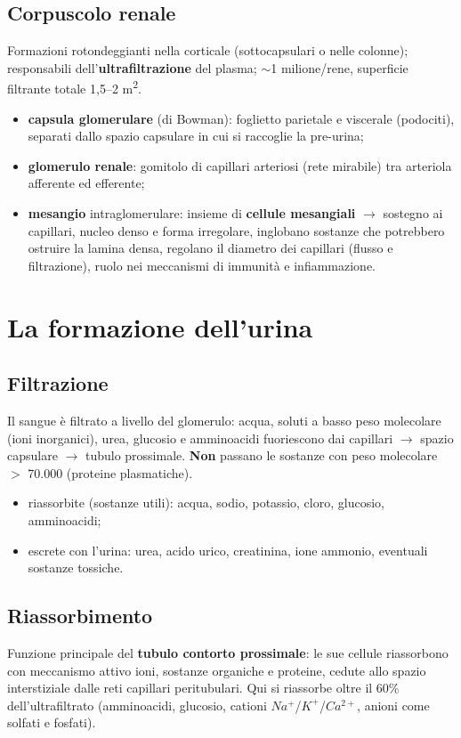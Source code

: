 \subsection{Corpuscolo renale}
Formazioni rotondeggianti nella corticale (sottocapsulari o nelle colonne); responsabili
dell'\textbf{ultrafiltrazione} del plasma; $\sim$1 milione/rene, superficie filtrante totale 1,5--2
m\textsuperscript{2}.
\begin{itemize}
  \item \textbf{capsula glomerulare} (di Bowman): foglietto parietale e viscerale (podociti),
    separati dallo spazio capsulare in cui si raccoglie la pre-urina;
  \item \textbf{glomerulo renale}: gomitolo di capillari arteriosi (rete mirabile) tra arteriola
    afferente ed efferente;
  \item \textbf{mesangio} intraglomerulare: insieme di \textbf{cellule mesangiali} $\rightarrow$
    sostegno ai capillari, nucleo denso e forma irregolare, inglobano sostanze che potrebbero
    ostruire la lamina densa, regolano il diametro dei capillari (flusso e filtrazione), ruolo nei
    meccanismi di immunità e infiammazione.
\end{itemize}

\section{La formazione dell'urina}

\subsection{Filtrazione}
Il sangue è filtrato a livello del glomerulo: acqua, soluti a basso peso molecolare (ioni
inorganici), urea, glucosio e amminoacidi fuoriescono dai capillari $\rightarrow$ spazio capsulare
$\rightarrow$ tubulo prossimale. \textbf{Non} passano le sostanze con peso molecolare $>$ 70.000
(proteine plasmatiche).
\begin{itemize}
  \item riassorbite (sostanze utili): acqua, sodio, potassio, cloro, glucosio, amminoacidi;
  \item escrete con l'urina: urea, acido urico, creatinina, ione ammonio, eventuali sostanze
    tossiche.
\end{itemize}

\subsection{Riassorbimento}
Funzione principale del \textbf{tubulo contorto prossimale}: le sue cellule riassorbono con
meccanismo attivo ioni, sostanze organiche e proteine, cedute allo spazio interstiziale dalle reti
capillari peritubulari. Qui si riassorbe oltre il 60\% dell'ultrafiltrato (amminoacidi, glucosio,
cationi $Na^+$/$K^+$/$Ca^{2+}$, anioni come solfati e fosfati).

